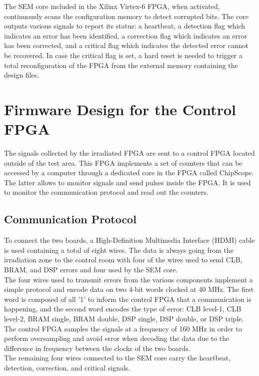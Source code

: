       The SEM core included in the Xilinx Virtex-6 FPGA, when activated, continuously scans the configuration memory to detect corrupted bits. The core outputs various signals to report its status: a heartbeat, a detection flag which indicates an error has been identified, a correction flag which indicates an error has been corrected, and a critical flag which indicates the detected error cannot be recovered. In case the critical flag is set, a hard reset is needed to trigger a total reconfiguration of the FPGA from the external memory containing the design files.

  \section{Firmware Design for the Control FPGA}

    The signals collected by the irradiated FPGA are sent to a control FPGA located outside of the test area. This FPGA implements a set of counters that can be accessed by a computer through a dedicated core in the FPGA called ChipScope. The latter allows to monitor signals and send pulses inside the FPGA. It is used to monitor the communication protocol and read out the counters.

    \subsection{Communication Protocol}

      To connect the two boards, a High-Definition Multimedia Interface (HDMI) cable is used containing a total of eight wires. The data is always going from the irradiation zone to the control room with four of the wires used to send CLB, BRAM, and DSP errors and four used by the SEM core. \\

      The four wires used to transmit errors from the various components implement a simple protocol and encode data on two 4-bit words clocked at 40 MHz. The first word is composed of all '1' to inform the control FPGA that a communication is happening, and the second word encodes the type of error: CLB level-1, CLB level-2, BRAM single, BRAM double, DSP single, DSP double, or DSP triple. The control FPGA samples the signals at a frequency of 160 MHz in order to perform oversampling and avoid error when decoding the data due to the difference in frequency between the clocks of the two boards. \\

      The remaining four wires connected to the SEM core carry the heartbeat, detection, correction, and critical signals.

